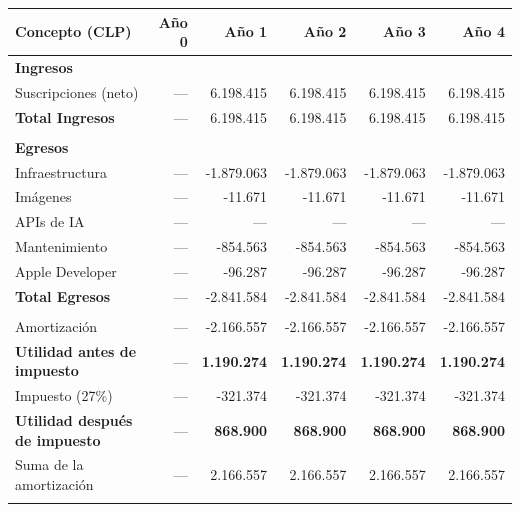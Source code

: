 \begin{table}[h!]
    \centering
    \renewcommand{\arraystretch}{1.3}
    \footnotesize
    \begin{tabular}{|m{3.2cm}|r|r|r|r|r|}
        \hline
        \rowcolor[HTML]{EFEFEF}
        \textbf{Concepto (CLP)} & \textbf{Año 0} & \textbf{Año 1} & \textbf{Año 2} & \textbf{Año 3} & \textbf{Año 4} \\ \hline
        
        \textbf{Ingresos } &&&&&\\ \hline
        Suscripciones (neto) & --- & 6.198.415 & 6.198.415 & 6.198.415 & 6.198.415 \\ \hline
        \rowcolor[HTML]{E8F5E9}
        \textbf{Total Ingresos} & --- & 6.198.415 & 6.198.415 & 6.198.415 & 6.198.415 \\ \hline
        & & & & & \\ \hline
        \textbf{Egresos} & & & & & \\ \hline
        Infraestructura & --- & -1.879.063 & -1.879.063 & -1.879.063 & -1.879.063 \\ \hline
        Imágenes & --- & -11.671 & -11.671 & -11.671 & -11.671 \\ \hline
        APIs de IA & --- & --- & --- & --- & --- \\ \hline
        Mantenimiento & --- & -854.563 & -854.563 & -854.563 & -854.563 \\ \hline
        Apple Developer & --- & -96.287 & -96.287 & -96.287 & -96.287 \\ \hline
        \rowcolor[HTML]{F3E5F5}
        \textbf{Total Egresos} & --- & -2.841.584 & -2.841.584 & -2.841.584 & -2.841.584 \\ \hline
        & & & & & \\ \hline
        Amortización & --- & -2.166.557 & -2.166.557 & -2.166.557 & -2.166.557 \\ \hline
        \textbf{Utilidad antes de impuesto} & --- & \textbf{1.190.274} & \textbf{1.190.274} & \textbf{1.190.274} & \textbf{1.190.274} \\ \hline
        Impuesto (27\%) & --- & -321.374 & -321.374 & -321.374 & -321.374 \\ \hline
        \textbf{Utilidad después de impuesto} & --- & \textbf{868.900} & \textbf{868.900} & \textbf{868.900} & \textbf{868.900} \\ \hline
        Suma de la amortización & --- & 2.166.557 & 2.166.557 & 2.166.557 & 2.166.557 \\ \hline
        & & & & & \\ \hline

\end{tabular}
\end{table}
